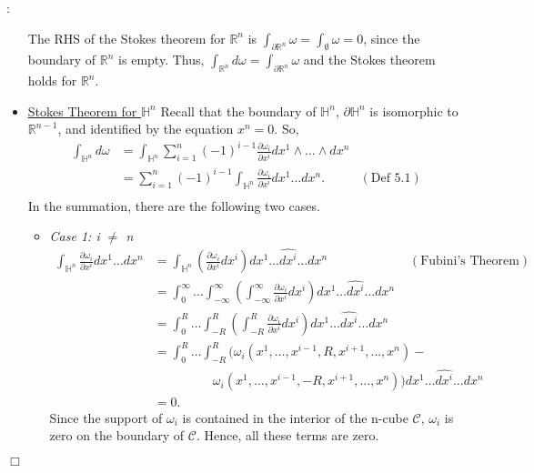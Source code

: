 \documentclass{article}
\theoremstyle{definition}
\theoremstyle{named}
\def\endproofmark{$\Box$}
\newenvironment{proof}{\par\noindent{\bf Proof}:}{\endproofmark\smallskip}
\begin{document}
\begin{proof}
\begin{itemize}
        The RHS of the Stokes theorem for $\mathbb{R}^n$ is $\int_{\partial \mathbb{R}^n} \omega = \int_{\emptyset} \omega = 0$, since the boundary of $\mathbb{R}^n$ is empty. Thus, $\int_{\mathbb{R}^n} d\omega = \int_{\partial \mathbb{R}^n} \omega $ and the Stokes theorem holds for $\mathbb{R}^n$.
        \item \underline{Stokes Theorem for $\mathbb{H}^n$}
        Recall that the boundary of $\mathbb{H}^n$, $\partial \mathbb{H}^n$ is isomorphic to $\mathbb{R}^{n-1}$, and identified by the equation $x^n = 0$. So, 
        \begin{align*}
            \int_{\mathbb{H}^n} d\omega &= \int_{\mathbb{H}^n} \sum_{i=1}^n (-1)^{i-1} \frac{\partial \omega_i}{\partial x^i} dx^1 \wedge \ldots \wedge dx^n \\
            &= \sum_{i=1}^n (-1)^{i-1} \int_{\mathbb{H}^n}   \frac{\partial \omega_i}{\partial x^i} dx^1 \ldots dx^n . & (\text{Def 5.1}) \\
        \end{align*}
        In the summation, there are the following two cases.
        \begin{itemize}
            \item \emph{Case 1: i $\neq$ n}
            \begin{align*}
                \int_{\mathbb{H}^n}   \frac{\partial \omega_i}{\partial x^i} dx^1 \ldots dx^n &= \int_{\mathbb{H}^n}  \left( \frac{\partial \omega_i}{\partial x^i} dx^i \right) dx^1 \ldots \widehat{dx^i} \ldots dx^n \ \ \ \ \ \ \ \ \ \ \ \ \ \ \ \ \ \ \ \ \ \ \ \ \ \ \ \ \ (\text{Fubini's Theorem})\\
                &=\int_{0}^{\infty} \ldots \int_{-\infty}^{\infty} \left(\int_{-\infty}^{\infty} \frac{\partial \omega_i}{\partial x^i} dx^i\right) dx^1 \ldots \widehat{dx^i} \ldots dx^n \\
                &= \int_{0}^{R} \ldots \int_{-R}^{R} \left(\int_{-R}^{R} \frac{\partial \omega_i}{\partial x^i} dx^i\right) dx^1 \ldots \widehat{dx^i} \ldots dx^n \\
                &= \int_{0}^{R} \ldots \int_{-R}^{R} (\omega_i(x^1, \ldots, x^{i-1}, R, x^{i+1}, \ldots, x^n) - \\
                & \ \ \ \ \ \ \ \ \ \ \ \  \ \ \ \ \ \ \ \ \ \omega_i(x^1, \ldots, x^{i-1}, -R, x^{i+1}, \ldots, x^n)) dx^1 \ldots \widehat{dx^i} \ldots dx^n \\
                &= 0.
            \end{align*}
            Since the support of $\omega_i$ is contained in the interior of the n-cube $\mathcal{C}$, $\omega_i$ is zero on the boundary of $\mathcal{C}$. Hence, all these terms are zero.  

\end{itemize}
\end{itemize}
\end{proof}
\end{document}
